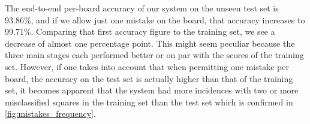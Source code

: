 \documentclass[../main.tex]{subfiles}
\begin{document}
The end-to-end per-board accuracy of our system on the unseen test set is 93.86\%, and if we allow just one mistake on the board, that accuracy increases to 99.71\%.
Comparing that first accuracy figure to the training set, we see a decrease of almost one percentage point. 
This might seem peculiar because the three main stages each performed better or on par with the scores of the training set.
However, if one takes into account that when permitting one mistake per board, the accuracy on the test set is actually higher than that of the training set, it becomes apparent that the system had more incidences with two or more misclassified squares in the training set than the test set which is confirmed in \cref{fig:mistakes_frequency}.
\begin{figure}
\end{figure}
\end{document}
